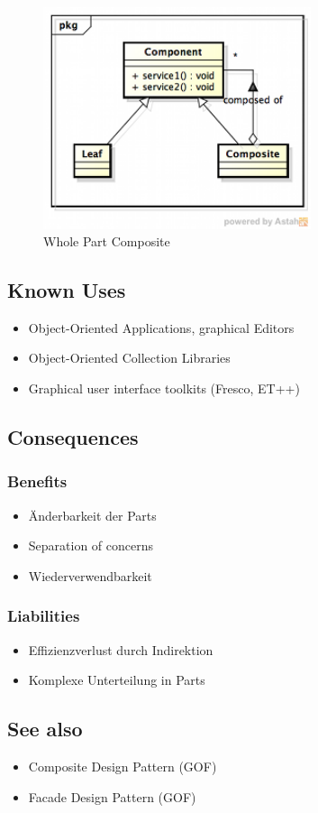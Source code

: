 \begin{figure}[H]
	\centering
	\includegraphics[width=0.7\textwidth]{content/posa1/images/whole-part-composite.png}
	\caption{Whole Part Composite}
\end{figure}

\subsection*{Known Uses}


\begin{itemize}
	\item Object-Oriented Applications, graphical Editors
	\item Object-Oriented Collection Libraries
	\item Graphical user interface toolkits (Fresco, ET++)
\end{itemize}

\subsection*{Consequences}


\subsubsection*{Benefits}


\begin{itemize}
	\item Änderbarkeit der Parts
	\item Separation of concerns
	\item Wiederverwendbarkeit
\end{itemize}

\subsubsection*{Liabilities}

\begin{itemize}
	\item Effizienzverlust durch Indirektion
	\item Komplexe Unterteilung in Parts
\end{itemize}

\subsection*{See also}

\begin{itemize}
	\item Composite Design Pattern (GOF)
	\item Facade Design Pattern (GOF)
\end{itemize}

